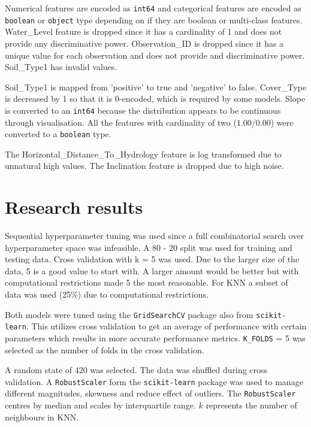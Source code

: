 \documentclass[conference]{IEEEtran}
\begin{document}
 Numerical features are encoded as \texttt{int64} and categorical features are encoded as \texttt{boolean} or \texttt{object} type depending on if they are boolean or multi-class features. Water\_Level feature is dropped since it has a cardinality of 1 and does not provide any discriminative power. Observation\_ID is dropped since it has a unique value for each observation and does not provide and discriminative power. Soil\_Type1 has invalid values. 
 
 Soil\_Type1 is mapped from 'positive' to true and 'negative' to false. Cover\_Type is decreased by 1 so that it is 0-encoded, which is required by some models. Slope is converted to an \texttt{int64} because the distribution appears to be continuous through visualisation. All the features with cardinality of two ($1.00$/$0.00$) were converted to a \texttt{boolean} type.
 
 The Horizontal\_Distance\_To\_Hydrology feature is log transformed due to unnatural high values. The Inclination feature is dropped due to high noise.
 
 

\section{Research results}

Sequential hyperparameter tuning was used since a full combinatorial search over hyperparameter space was infeasible. A 80 - 20 split was used for training and testing data. Cross validation with k = 5 was used. Due to the larger size of the data, 5 is a good value to start with. A larger amount would be better but with computational restrictions made 5 the most reasonable. For KNN a subset of data was used (25\%) due to computational restrictions.

Both models were tuned using the \texttt{GridSearchCV} package also from \texttt{scikit-learn}. This utilizes cross validation to get an average of performance with certain parameters which results in more accurate performance metrics. \texttt{K\_FOLDS} = 5 was selected as the number of folds in the cross validation. 

A random state of 420 was selected. The data was shuffled during cross validation. A \texttt{RobustScaler} form the \texttt{scikit-learn} package was used to manage different magnitudes, skewness and reduce effect of outliers. The \texttt{RobustScaler} centres by median and scales by interquartile range. $k$ represents the number of neighbours in KNN.
\end{document}
